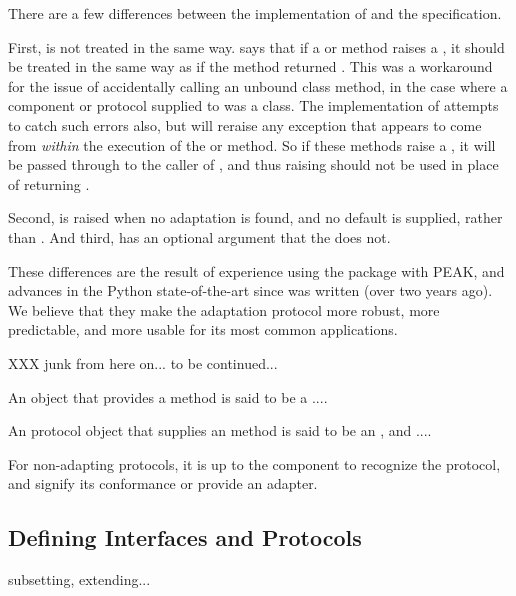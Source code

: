 \begin{note}

There are a few differences between the 
implementation of  and the  specification.

First,  is not treated in the same way.  
says that if a  or  method raises
a , it should be treated in the same way as if the
method returned .  This was a workaround for the issue of
accidentally calling an unbound class method, in the case where a component
or protocol supplied to  was a class.  The
 implementation of  attempts to catch
such errors also, but will reraise any exception that appears to come from
\emph{within} the execution of the  or
 method.  So if these methods raise a
, it will be passed through to the caller of
, and thus raising  should not be used
in place of returning .

Second,  is raised when no adaptation is
found, and no default is supplied, rather than .
And third,  has an optional 
argument that the   does not.

These differences are the result of experience using the 
package with PEAK, and advances in the Python state-of-the-art since
 was written (over two years ago).  We believe that they make the
adaptation protocol more robust, more predictable, and more usable for
its most common applications.
\end{note}


XXX junk from here on...  to be continued...

An object that provides a  method is said to be a
....


An protocol object that supplies an  method is said to be
an , and ....


For non-adapting protocols, it is up to the
component to recognize the protocol, and signify its conformance or provide
an adapter.


\subsection{Defining Interfaces and Protocols}
subsetting, extending...

